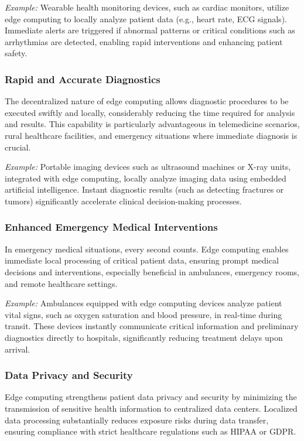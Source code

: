 \documentclass[runningheads]{llncs}
\begin{document}
\noindent\textit{Example:} Wearable health monitoring devices, such as cardiac monitors, utilize edge computing to locally analyze patient data (e.g., heart rate, ECG signals). Immediate alerts are triggered if abnormal patterns or critical conditions such as arrhythmias are detected, enabling rapid interventions and enhancing patient safety.

\subsubsection{Rapid and Accurate Diagnostics}
The decentralized nature of edge computing allows diagnostic procedures to be executed swiftly and locally, considerably reducing the time required for analysis and results. This capability is particularly advantageous in telemedicine scenarios, rural healthcare facilities, and emergency situations where immediate diagnosis is crucial.

\noindent\textit{Example:} Portable imaging devices such as ultrasound machines or X-ray units, integrated with edge computing, locally analyze imaging data using embedded artificial intelligence. Instant diagnostic results (such as detecting fractures or tumors) significantly accelerate clinical decision-making processes.

\subsubsection{Enhanced Emergency Medical Interventions}
In emergency medical situations, every second counts. Edge computing enables immediate local processing of critical patient data, ensuring prompt medical decisions and interventions, especially beneficial in ambulances, emergency rooms, and remote healthcare settings.

\noindent\textit{Example:} Ambulances equipped with edge computing devices analyze patient vital signs, such as oxygen saturation and blood pressure, in real-time during transit. These devices instantly communicate critical information and preliminary diagnostics directly to hospitals, significantly reducing treatment delays upon arrival.

\subsubsection{Data Privacy and Security}
Edge computing strengthens patient data privacy and security by minimizing the transmission of sensitive health information to centralized data centers. Localized data processing substantially reduces exposure risks during data transfer, ensuring compliance with strict healthcare regulations such as HIPAA or GDPR.
\end{document}
